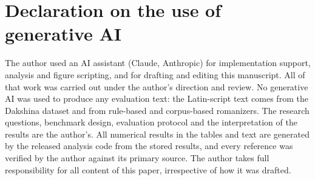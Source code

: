 \documentclass[11pt]{article}
\begin{document}
\section*{Declaration on the use of generative AI}
The author used an AI assistant (Claude, Anthropic) for implementation support, analysis and figure scripting, and for drafting and editing this manuscript. All of that work was carried out under the author's direction and review. No generative AI was used to produce any evaluation text: the Latin-script text comes from the Dakshina dataset and from rule-based and corpus-based romanizers. The research questions, benchmark design, evaluation protocol and the interpretation of the results are the author's. All numerical results in the tables and text are generated by the released analysis code from the stored results, and every reference was verified by the author against its primary source. The author takes full responsibility for all content of this paper, irrespective of how it was drafted.




\appendix
\end{document}
